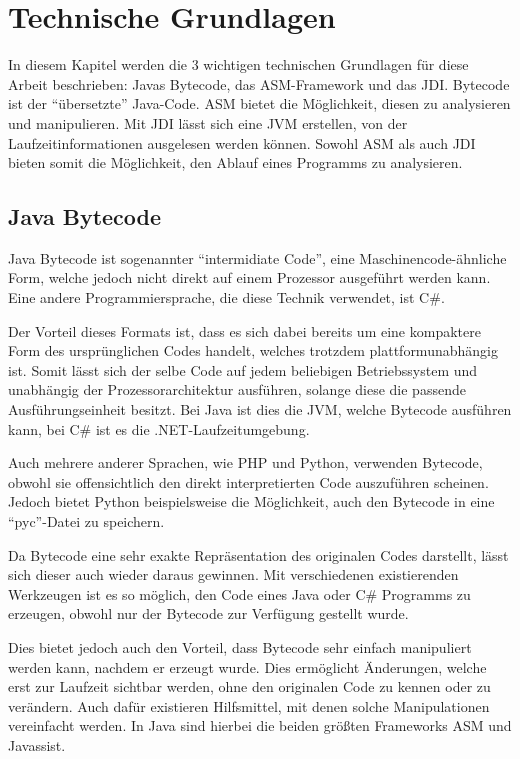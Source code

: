
\chapter{Technische Grundlagen}

In diesem Kapitel werden die 3 wichtigen technischen Grundlagen für diese Arbeit beschrieben: Javas Bytecode, das ASM-Framework und das \ac{JDI}. Bytecode ist der "`übersetzte"' Java-Code. ASM bietet die Möglichkeit, diesen zu analysieren und manipulieren. Mit \ac{JDI} lässt sich eine \ac{JVM} erstellen, von der Laufzeitinformationen ausgelesen werden können. Sowohl ASM als auch \ac{JDI} bieten somit die Möglichkeit, den Ablauf eines Programms zu analysieren.

\section{Java Bytecode} 

Java Bytecode ist sogenannter "`intermidiate Code"', eine Maschinencode-ähnliche Form, welche jedoch nicht direkt auf einem Prozessor ausgeführt werden kann. Eine andere Programmiersprache, die diese Technik verwendet, ist C\#.

Der Vorteil dieses Formats ist, dass es sich dabei bereits um eine kompaktere Form des ursprünglichen Codes handelt, welches trotzdem plattformunabhängig ist. Somit lässt sich der selbe Code auf jedem beliebigen Betriebssystem und unabhängig der Prozessorarchitektur ausführen, solange diese die passende Ausführungseinheit besitzt.
Bei Java ist dies die \ac{JVM}, welche Bytecode ausführen kann, bei C\# ist es die .NET-Laufzeitumgebung.

Auch mehrere anderer Sprachen, wie \ac{PHP} und Python, verwenden Bytecode, obwohl sie offensichtlich den direkt interpretierten Code auszuführen scheinen. Jedoch bietet Python beispielsweise die Möglichkeit, auch den Bytecode in eine "`pyc"'-Datei zu speichern.

Da Bytecode eine sehr exakte Repräsentation des originalen Codes darstellt, lässt sich dieser auch wieder daraus gewinnen. Mit verschiedenen existierenden Werkzeugen ist es so möglich, den Code eines Java oder C\# Programms zu erzeugen, obwohl nur der Bytecode zur Verfügung gestellt wurde.

Dies bietet jedoch auch den Vorteil, dass Bytecode sehr einfach manipuliert werden kann, nachdem er erzeugt wurde. Dies ermöglicht Änderungen, welche erst zur Laufzeit sichtbar werden, ohne den originalen Code zu kennen oder zu verändern. Auch dafür existieren Hilfsmittel, mit denen solche Manipulationen vereinfacht werden. In Java sind hierbei die beiden größten Frameworks ASM und Javassist.

